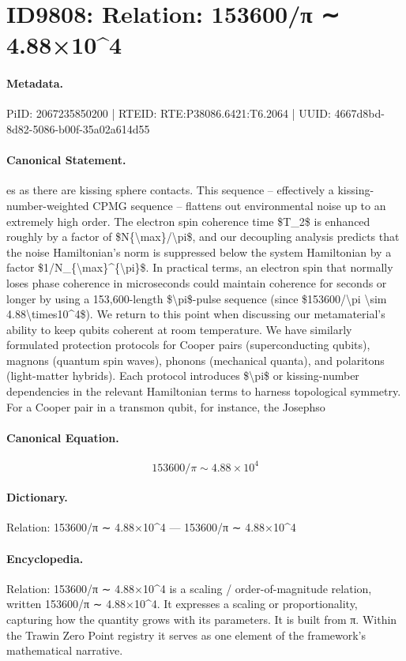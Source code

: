 \section*{ID9808: Relation: 153600/π ∼ 4.88×10\textasciicircum{}4}
\paragraph{Metadata.}
PiID: 2067235850200 | RTEID: RTE:P38086.6421:T6.2064 | UUID: 4667d8bd-8d82-5086-b00f-35a02a614d55

\paragraph{Canonical Statement.}
es as there are kissing sphere contacts. This sequence – effectively a kissing-number-weighted CPMG sequence – flattens out environmental noise up to an extremely high order. The electron spin coherence time \$T\_2\$ is enhanced roughly by a factor of \$N\{\textbackslash{}max\}/\textbackslash{}pi\$, and our decoupling analysis predicts that the noise Hamiltonian’s norm is suppressed below the system Hamiltonian by a factor \$1/N\_\{\textbackslash{}max\}\textasciicircum{}\{\textbackslash{}pi\}\$. In practical terms, an electron spin that normally loses phase coherence in microseconds could maintain coherence for seconds or longer by using a 153,600-length \$\textbackslash{}pi\$-pulse sequence (since \$153600/\textbackslash{}pi \textbackslash{}sim 4.88\textbackslash{}times10\textasciicircum{}4\$). We return to this point when discussing our metamaterial’s ability to keep qubits coherent at room temperature. We have similarly formulated protection protocols for Cooper pairs (superconducting qubits), magnons (quantum spin waves), phonons (mechanical quanta), and polaritons (light-matter hybrids). Each protocol introduces \$\textbackslash{}pi\$ or kissing-number dependencies in the relevant Hamiltonian terms to harness topological symmetry. For a Cooper pair in a transmon qubit, for instance, the Josephso

\paragraph{Canonical Equation.}
\[
153600/\pi \sim 4.88\times10^4
\]

\paragraph{Dictionary.}
Relation: 153600/π ∼ 4.88×10\textasciicircum{}4 — 153600/π ∼ 4.88×10\textasciicircum{}4

\paragraph{Encyclopedia.}
Relation: 153600/π ∼ 4.88×10\textasciicircum{}4 is a scaling / order-of-magnitude relation, written 153600/π ∼ 4.88×10\textasciicircum{}4. It expresses a scaling or proportionality, capturing how the quantity grows with its parameters. It is built from π. Within the Trawin Zero Point registry it serves as one element of the framework's mathematical narrative.
